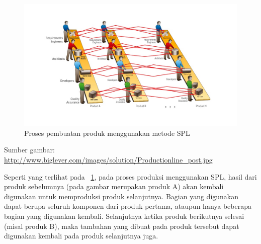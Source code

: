 \begin{figure}
	\centering
	\includegraphics[width=1.1\textwidth]
	{pics/spl.jpg}
	\caption{Proses pembuatan produk menggunakan metode SPL}
	\label{fig:spl}
\end{figure}
\vspace{-0.8cm}
\begin{center}
	{\small Sumber gambar: \url{http://www.biglever.com/images/solution/Productionline_post.jpg}}
\end{center}

Seperti yang terlihat pada \pic~\ref{fig:spl}, pada proses produksi menggunakan SPL, hasil dari produk sebelumnya (pada gambar merupakan produk A) akan kembali digunakan untuk memproduksi produk selanjutnya. Bagian yang digunakan dapat berupa seluruh komponen dari produk pertama, ataupun hanya beberapa bagian yang digunakan kembali. Selanjutnya ketika produk berikutnya selesai (misal produk B), maka tambahan yang dibuat pada produk tersebut dapat digunakan kembali pada produk selanjutnya juga.
